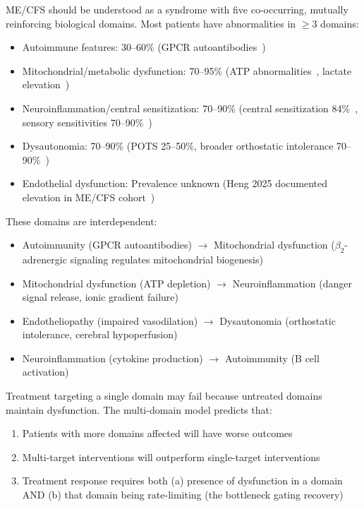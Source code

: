 \begin{hypothesis}
\label{hyp:multi-domain}
ME/CFS should be understood as a syndrome with five co-occurring, mutually reinforcing biological domains. Most patients have abnormalities in $\geq$3 domains:

\begin{itemize}
    \item Autoimmune features: 30--60\% (GPCR autoantibodies~\cite{Loebel2016,Bynke2020})
    \item Mitochondrial/metabolic dysfunction: 70--95\% (ATP abnormalities~\cite{heng2025mecfs}, lactate elevation~\cite{Lien2019lactate})
    \item Neuroinflammation/central sensitization: 70--90\% (central sensitization 84\%~\cite{Nijs2021sensitization}, sensory sensitivities 70--90\%~\cite{Jason2013sensory})
    \item Dysautonomia: 70--90\% (POTS 25--50\%, broader orthostatic intolerance 70--90\%~\cite{Newton2007autonomicDysfunction})
    \item Endothelial dysfunction: Prevalence unknown (Heng 2025 documented elevation in ME/CFS cohort~\cite{heng2025mecfs})
\end{itemize}

These domains are interdependent:
\begin{itemize}
    \item Autoimmunity (GPCR autoantibodies) $\rightarrow$ Mitochondrial dysfunction ($\beta_2$-adrenergic signaling regulates mitochondrial biogenesis)
    \item Mitochondrial dysfunction (ATP depletion) $\rightarrow$ Neuroinflammation (danger signal release, ionic gradient failure)
    \item Endotheliopathy (impaired vasodilation) $\rightarrow$ Dysautonomia (orthostatic intolerance, cerebral hypoperfusion)
    \item Neuroinflammation (cytokine production) $\rightarrow$ Autoimmunity (B cell activation)
\end{itemize}

Treatment targeting a single domain may fail because untreated domains maintain dysfunction. The multi-domain model predicts that:
\begin{enumerate}
    \item Patients with more domains affected will have worse outcomes
    \item Multi-target interventions will outperform single-target interventions
    \item Treatment response requires both (a) presence of dysfunction in a domain AND (b) that domain being rate-limiting (the bottleneck gating recovery)
\end{enumerate}
\end{hypothesis}


